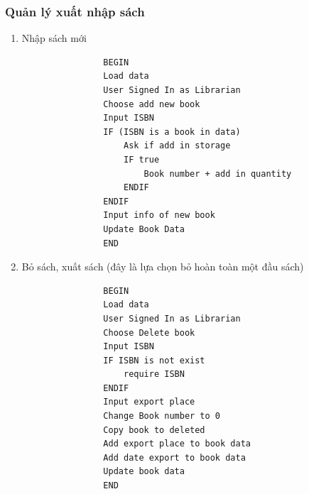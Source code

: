 \documentclass[12pt,a4paper]{report}
\begin{document}
            \subsubsection{Quản lý xuất nhập sách}
            \begin{enumerate}
                \item Nhập sách mới
                \begin{verbatim}
                BEGIN
                Load data
                User Signed In as Librarian
                Choose add new book
                Input ISBN
                IF (ISBN is a book in data)
                    Ask if add in storage
                    IF true
                        Book number + add in quantity
                    ENDIF
                ENDIF
                Input info of new book
                Update Book Data
                END
            \end{verbatim}
                \item Bỏ sách, xuất sách
                (đây là lựa chọn bỏ hoàn toàn một đầu sách)
                \begin{verbatim}
                BEGIN
                Load data
                User Signed In as Librarian
                Choose Delete book
                Input ISBN
                IF ISBN is not exist
                    require ISBN
                ENDIF
                Input export place
                Change Book number to 0
                Copy book to deleted
                Add export place to book data
                Add date export to book data
                Update book data
                END
                \end{verbatim}
            \end{enumerate}
            \newpage
\end{document}
